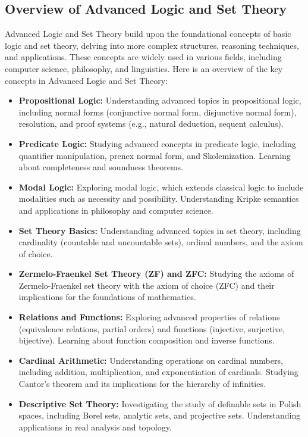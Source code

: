 \documentclass[openany]{book}
\begin{document}
\subsection{Overview of Advanced Logic and Set Theory}
Advanced Logic and Set Theory build upon the foundational concepts of basic logic and set theory, delving into more complex structures, reasoning techniques, and applications. These concepts are widely used in various fields, including computer science, philosophy, and linguistics. Here is an overview of the key concepts in Advanced Logic and Set Theory:
\begin{itemize}
    \item \textbf{Propositional Logic:} Understanding advanced topics in propositional logic, including normal forms (conjunctive normal form, disjunctive normal form), resolution, and proof systems (e.g., natural deduction, sequent calculus).
    \item \textbf{Predicate Logic:} Studying advanced concepts in predicate logic, including quantifier manipulation, prenex normal form, and Skolemization. Learning about completeness and soundness theorems.
    \item \textbf{Modal Logic:} Exploring modal logic, which extends classical logic to include modalities such as necessity and possibility. Understanding Kripke semantics and applications in philosophy and computer science.
    \item \textbf{Set Theory Basics:} Understanding advanced topics in set theory, including cardinality (countable and uncountable sets), ordinal numbers, and the axiom of choice.
    \item \textbf{Zermelo-Fraenkel Set Theory (ZF) and ZFC:} Studying the axioms of Zermelo-Fraenkel set theory with the axiom of choice (ZFC) and their implications for the foundations of mathematics.
    \item \textbf{Relations and Functions:} Exploring advanced properties of relations (equivalence relations, partial orders) and functions (injective, surjective, bijective). Learning about function composition and inverse functions.
    \item \textbf{Cardinal Arithmetic:} Understanding operations on cardinal numbers, including addition, multiplication, and exponentiation of cardinals. Studying Cantor's theorem and its implications for the hierarchy of infinities.
    \item \textbf{Descriptive Set Theory:} Investigating the study of definable sets in Polish spaces, including Borel sets, analytic sets, and projective sets. Understanding applications in real analysis and topology.

\end{itemize}
\end{document}
